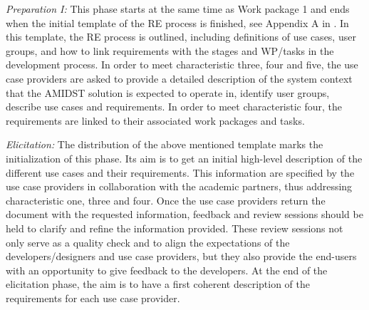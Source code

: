 \emph{Preparation I:}  This phase starts at the same time as Work package 1 and ends when the initial template of the RE process is finished,
see Appendix A in \cite{Fer14}.  In this template, the RE process
is outlined, including definitions of use cases, user groups, and how to link requirements with the stages and WP/tasks
in the development process.  In order to meet characteristic three, four and five, the use case providers are asked to
provide a detailed description of the system context that the AMIDST solution is expected to operate in, identify user
groups, describe use cases and requirements.  In order to meet characteristic four, the requirements are linked to their
associated work packages and tasks. 

\emph{Elicitation:} The distribution of the above mentioned template marks the initialization of this phase.  Its aim is
to get an initial high-level description of the different use cases and their requirements. This information are
specified by the use case providers in collaboration with the academic partners, thus addressing characteristic one,
three and four.  Once the use case providers return the document with the requested information, feedback and
review sessions should be held to clarify and refine the information provided. These review sessions not only serve as a
quality check and to align the expectations of the developers/designers and use case providers, but they also provide the 
end-users with an
opportunity to give feedback to the developers.  At the end of the elicitation phase, the
aim is to have a first coherent description of the requirements for each use case provider. 

